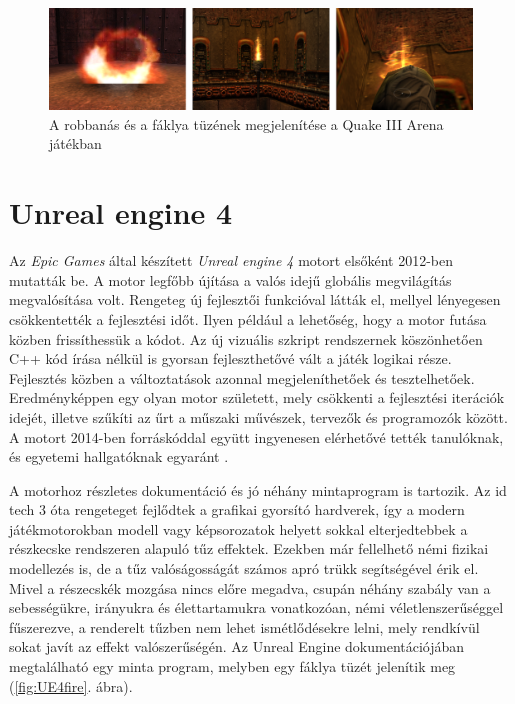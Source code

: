 
\begin{figure}[h]
\centering
\includegraphics[width=\textwidth]{kepek/quake3fire.png}
\caption{A robbanás és a fáklya tüzének megjelenítése a Quake III Arena játékban}
\label{fig:quake3fire}
\end{figure}



\section{Unreal engine 4}

Az \textit{Epic Games} által készített \textit{Unreal engine 4} motort elsőként 2012-ben mutatták be. A motor legfőbb újítása a valós idejű globális megvilágítás megvalósítása volt. Rengeteg új fejlesztői funkcióval látták el, mellyel lényegesen csökkentették a fejlesztési időt. Ilyen például a lehetőség, hogy a motor futása közben frissíthessük a kódot. Az új vizuális szkript rendszernek köszönhetően C++ kód írása nélkül is gyorsan fejleszthetővé vált a játék logikai része. Fejlesztés közben a változtatások azonnal megjeleníthetőek és tesztelhetőek. Eredményképpen egy olyan motor született, mely csökkenti a fejlesztési iterációk idejét, illetve szűkíti az űrt a műszaki művészek, tervezők és programozók között. A motort 2014-ben forráskóddal együtt ingyenesen elérhetővé tették tanulóknak, és egyetemi hallgatóknak egyaránt \cite{wikUE4}.

A motorhoz részletes dokumentáció és jó néhány mintaprogram is tartozik. Az id tech 3 óta rengeteget fejlődtek a grafikai gyorsító hardverek, így a modern játékmotorokban modell vagy képsorozatok helyett sokkal elterjedtebbek a részkecske rendszeren alapuló tűz effektek. Ezekben már fellelhető némi fizikai modellezés is, de a tűz valóságosságát számos apró trükk segítségével érik el. Mivel a részecskék mozgása nincs előre megadva, csupán néhány szabály van a sebességükre, irányukra és élettartamukra vonatkozóan, némi véletlenszerűséggel fűszerezve, a renderelt tűzben nem lehet ismétlődésekre lelni, mely rendkívül sokat javít az effekt valószerűségén. Az Unreal Engine dokumentációjában megtalálható egy minta program, melyben egy fáklya tüzét jelenítik meg (\ref{fig:UE4fire}. ábra).

